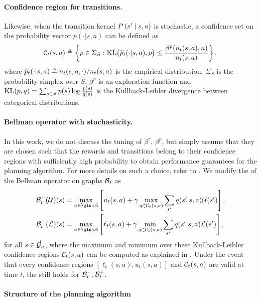 \paragraph{Confidence region for transitions.}

Likewise, when the transition kernel $P\left(s' \;\middle|\; s,a\right)$ is stochastic, a confidence set on the probability vector $p(\cdot|s,a)$ can be defined as
$$\cC_t(s,a) \eqdef \left\{p\in \Sigma_S :  \KL\!\big(\hp_t(\cdot|s,a),p\big) \leq \frac {\beta^p(n_t(s,a), n)} {n_t(s,a)}\right\},$$
where $\hp_t(\cdot|s,a) \eqdef n_t(s,a,\cdot) / n_t(s,a)$ is the empirical distribution, $\Sigma_S$ is the probability simplex over $S$, $\beta^p$ is an exploration function and $\operatorname{KL}(p,q)= \sum_{s \in S}  p(s) \log \tfrac{ p(s)} {{q}(s)}$ is the Kullback-Leibler divergence between categorical distributions.

\paragraph{Bellman operator with stochasticity.}

In this work, we do not discuss the tuning of $\beta^r$, $\beta^p$, but simply assume that they are chosen such that the rewards and transitions belong to their confidence regions with sufficiently high probability to obtain performance guarantees for the  planning algorithm. For more details on such a choice, refer to \citep[e.g.][]{Leurent2020practical, Jonsson2020planning}. We modify the  of the Bellman operator on graphs $\mathcal{B}_t$ as
\begin{align*}
\cB_t^+(\cU)(s) &= \max_{a\in \cA} \left[u_t(s,a) + \gamma \max_{q \in \cC_t(s,a)} \sum_{s'} q(s'|s,a) \cU(s')\right], \\
\cB_t^-(\cL)(s) &= \max_{a\in \cA} \left[\ell_t(s,a) + \gamma \min_{q \in \cC_t(s,a)} \sum_{s'} q(s'|s,a)\cL(s')\right],
\end{align*}
for all $s\in\mathring{\mathcal{G}_n}$, where the maximum and minimum over these Kullback-Leibler confidence regions $\mathcal{C}_t(s,a)$ can be computed as explained in \citep[Appendix A of][]{Filippi2010optimism}. Under the event that every confidence regions $[\ell_t(s,a), u_t(s,a)]$ and $\mathcal{C}_t(s,a)$ are valid at time $t$, the  still holds for $\mathcal{B}_t^-, \mathcal{B}_t^+$.

\paragraph{Structure of the planning algorithm}

